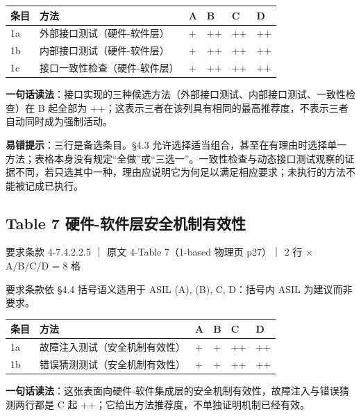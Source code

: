 \begin{center}
\begingroup\small
\setlength{\tabcolsep}{4pt}
\begin{tabularx}{\linewidth}{@{}XXXXXX@{}}
\toprule
条目 & 方法 & A & B & C & D \\
\midrule
1a & 外部接口测试（硬件-软件层） & + & ++ & ++ & ++ \\
1b & 内部接口测试（硬件-软件层） & + & ++ & ++ & ++ \\
1c & 接口一致性检查（硬件-软件层） & + & ++ & ++ & ++ \\
\bottomrule
\end{tabularx}
\endgroup
\end{center}

\textbf{一句话读法}：接口实现的三种候选方法（外部接口测试、内部接口测试、一致性检查）在 B 起全部为 ++；这表示三者在该列具有相同的最高推荐度，不表示三者自动同时成为强制活动。

\textbf{易错提示}：三行是备选条目。§4.3 允许选择适当组合，甚至在有理由时选择单一方法；表格本身没有规定“全做”或“三选一”。一致性检查与动态接口测试观察的证据不同，若只选其中一种，理由应说明它为何足以满足相应要求；未执行的方法不能被记成已执行。

\subsection{Table 7 硬件-软件层安全机制有效性}

要求条款 4-7.4.2.2.5 ｜ 原文 4-Table 7（1-based 物理页 p27）｜ 2 行 \(\times\) A/B/C/D = 8 格

\begin{noteblock}
要求条款依 §4.4 括号语义适用于 ASIL (A), (B), C, D：括号内 ASIL 为建议而非要求。
\end{noteblock}

\begin{center}
\begingroup\small
\setlength{\tabcolsep}{4pt}
\begin{tabularx}{\linewidth}{@{}XXXXXX@{}}
\toprule
条目 & 方法 & A & B & C & D \\
\midrule
1a & 故障注入测试（安全机制有效性） & + & + & ++ & ++ \\
1b & 错误猜测测试（安全机制有效性） & + & + & ++ & ++ \\
\bottomrule
\end{tabularx}
\endgroup
\end{center}

\textbf{一句话读法}：这张表面向硬件-软件集成层的安全机制有效性，故障注入与错误猜测两行都是 C 起 ++；它给出方法推荐度，不单独证明机制已经有效。

